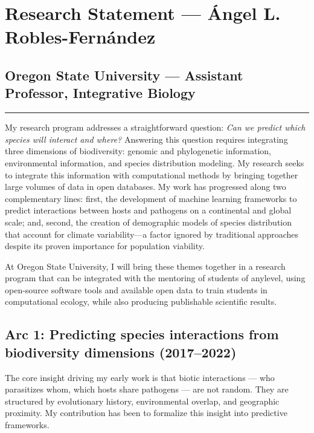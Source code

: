 \documentclass[11pt,letterpaper]{article}
\begin{document}
\section{Research Statement --- Ángel L.
Robles-Fernández}\label{research-statement-uxe1ngel-l.-robles-fernuxe1ndez}

\subsection*{Oregon State University --- Assistant Professor,
Integrative
Biology}\label{oregon-state-university-assistant-professor-integrative-biology}

\begin{center}\rule{0.5\linewidth}{0.5pt}\end{center}

My research program addresses a straightforward question: \emph{Can we predict which species will interact and where?} Answering this question requires integrating three dimensions of biodiversity: genomic and  phylogenetic information, environmental information, and species distribution modeling. My research seeks to integrate this information with computational methods by bringing together large volumes of data in open databases. My work has progressed along two complementary lines: first, the development of machine learning frameworks to predict interactions between hosts and pathogens on a continental and global scale; and, second, the creation of demographic models of species distribution that account for climate variability—a factor ignored by traditional approaches despite its proven importance for population viability.

At Oregon State University, I will bring these themes together in a research program that can be integrated with the mentoring of students of anylevel, using open-source software tools and available open data to train students in computational ecology, while also producing publishable scientific results.

\subsection*{Arc 1: Predicting species interactions from biodiversity
dimensions
(2017--2022)}\label{arc-1-predicting-species-interactions-from-biodiversity-dimensions-20172022}

The core insight driving my early work is that biotic interactions ---
who parasitizes whom, which hosts share pathogens --- are not random.
They are structured by evolutionary history, environmental overlap, and
geographic proximity. My contribution has been to formalize this insight into predictive frameworks.
\end{document}
